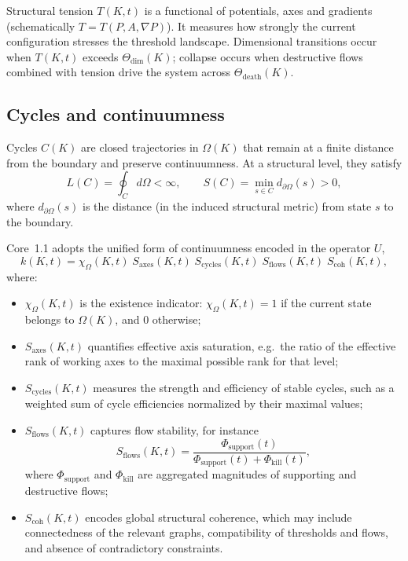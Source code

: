 Structural tension \(T(K,t)\) is a functional of potentials, axes and gradients (schematically \(T=T(P,A,\nabla P)\)).
It measures how strongly the current configuration stresses the threshold landscape.
Dimensional transitions occur when \(T(K,t)\) exceeds \(\Theta_{\mathrm{dim}}(K)\); collapse occurs when destructive flows combined with tension drive the system across \(\Theta_{\mathrm{death}}(K)\).

\subsection{Cycles and continuumness}

Cycles \(C(K)\) are closed trajectories in \(\Omega(K)\) that remain at a finite distance from the boundary and preserve continuumness.
At a structural level, they satisfy
\[
    L(C) = \oint_{C} d\Omega < \infty,\qquad
    S(C) = \min_{s \in C} d_{\partial\Omega}(s) > 0,
\]
where \(d_{\partial\Omega}(s)\) is the distance (in the induced structural metric) from state \(s\) to the boundary.

Core~1.1 adopts the unified form of continuumness encoded in the operator \(U\),
\[
    k(K,t)
    = \chi_{\Omega}(K,t)\;
      S_{\mathrm{axes}}(K,t)\;
      S_{\mathrm{cycles}}(K,t)\;
      S_{\mathrm{flows}}(K,t)\;
      S_{\mathrm{coh}}(K,t),
\]
where:
\begin{itemize}
    \item \(\chi_{\Omega}(K,t)\) is the existence indicator:
          \(\chi_{\Omega}(K,t)=1\) if the current state belongs to \(\Omega(K)\), and \(0\) otherwise;
    \item \(S_{\mathrm{axes}}(K,t)\) quantifies effective axis saturation, e.g.\ the ratio of the effective rank of working axes to the maximal possible rank for that level;
    \item \(S_{\mathrm{cycles}}(K,t)\) measures the strength and efficiency of stable cycles, such as a weighted sum of cycle efficiencies normalized by their maximal values;
    \item \(S_{\mathrm{flows}}(K,t)\) captures flow stability, for instance
          \[
              S_{\mathrm{flows}}(K,t)
              = \frac{\Phi_{\mathrm{support}}(t)}
                     {\Phi_{\mathrm{support}}(t)+\Phi_{\mathrm{kill}}(t)},
          \]
          where \(\Phi_{\mathrm{support}}\) and \(\Phi_{\mathrm{kill}}\) are aggregated magnitudes of supporting and destructive flows;
    \item \(S_{\mathrm{coh}}(K,t)\) encodes global structural coherence, which may include connectedness of the relevant graphs, compatibility of thresholds and flows, and absence of contradictory constraints.
\end{itemize}

